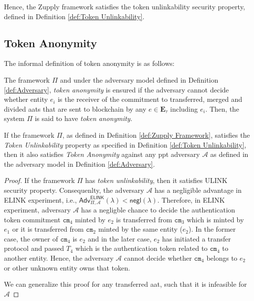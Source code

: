 Hence, the Zupply framework satisfies the token unlinkability security property, defined in Definition \ref{def:Token Unlinkability}.


\subsection{Token Anonymity}
\label{app-sec:Token Anonymity}

The informal definition of token anonymity is as follows:

\begin{definition}
    \label{def:informal-Token anonymity}
    The framework  \( \Pi \) and under the adversary model defined in Definition \ref{def:Adversary}, \textit{token anonymity} is ensured if the adversary cannot decide whether entity $e_i$ is the receiver of the commitment to transferred, merged and divided \gls{aat}s that are sent to blockchain by any $e \in \mathbf{E}_\tau$ including $e_i$. Then, the system $\Pi$ is said to have \textit{token anonymity}. 
\end{definition}

\begin{theorem}
\label{theorem:token-anonymity}
If the framework \( \Pi \), as defined in Definition \ref{def:Zupply Framework}, satisfies the \textit{Token Unlinkability} property as specified in Definition \ref{def:Token Unlinkability}, then it also satisfies \textit{Token Anonymity} against any \gls{ppt} adversary $\mathcal{A}$ as defined in the adversary model in Definition \ref{def:Adversary}.
\end{theorem}
\begin{proof}
    If the framework $\Pi$ has \textit{token unlinkability}, then it satisfies \textsf{ULINK} security property. Consequenlty, the adversary $\mathcal{A}$ has a negligible advantage in \textsf{ELINK} experiment, i.e., $\mathsf{Adv}^{\mathsf{ELINK}}_{\Pi, \mathcal{A}}(\lambda) < \mathsf{negl}(\lambda)$. Therefore, in \textsf{ELINK} experiment, adversary $\mathcal{A}$ has a negligble chance to decide the authentication token commitment $\texttt{cm}_4$ minted by $e_2$ is transferred from $\texttt{cm}_3$ which is minted by $e_1$ or it is transferred from $\texttt{cm}_2$ minted by the same entity ($e_2$). In the former case, the owner of $\texttt{cm}_4$ is $e_2$ and in the later case, $e_2$ has initiated a transfer protocol and passed $T_4$ which is the authentication token related to $\texttt{cm}_4$ to another entity. Hence, the adversary $\mathcal{A}$ cannot decide whether $\texttt{cm}_4$ belongs to $e_2$ or other unknown entity owns that token. 

    We can generalize this proof for any transferred \gls{aat}, such that it is infeasible for $\mathcal{A}$ 
\end{proof}

